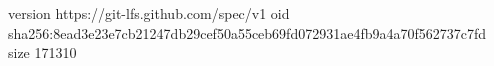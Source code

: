 version https://git-lfs.github.com/spec/v1
oid sha256:8ead3e23e7cb21247db29cef50a55ceb69fd072931ae4fb9a4a70f562737c7fd
size 171310
